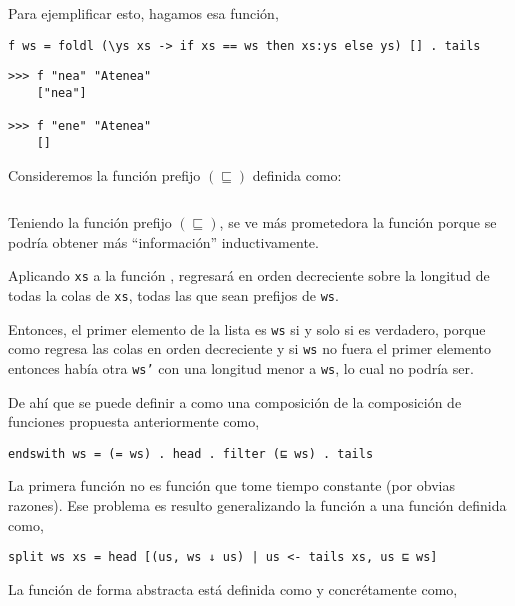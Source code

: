 Para ejemplificar esto, hagamos esa función,
\begin{verbatim}
f ws = foldl (\ys xs -> if xs == ws then xs:ys else ys) [] . tails
\end{verbatim}

\begin{verbatim}
>>> f "nea" "Atenea"
    ["nea"]

>>> f "ene" "Atenea"
    []
\end{verbatim}

Consideremos la función prefijo $(\sqsubseteq)$ definida como:

\inputminted{haskell}{definiciones/prefix.hs}

Teniendo la función prefijo $(\sqsubseteq)$, se ve más prometedora la función
 porque se podría obtener más ``información'' inductivamente.

Aplicando \texttt{xs} a la función , regresará en orden decreciente
sobre la longitud de todas la colas de \texttt{xs}, todas las que sean prefijos de \texttt{ws}.


Entonces, el primer elemento de la lista es \texttt{ws} si y solo si  es
verdadero, porque como  regresa las colas en orden decreciente y si \texttt{ws} no 
fuera el primer elemento entonces había otra \texttt{ws'} con una longitud menor a \texttt{ws}, lo
cual no podría ser.

De ahí que se puede definir a  como una composición de la composición de funciones
 propuesta anteriormente como,

\begin{verbatim}
endswith ws = (= ws) . head . filter (⊑ ws) . tails
\end{verbatim}

La primera función  no es función que tome tiempo constante (por obvias razones). 
Ese problema es resulto generalizando la función  a una función
 definida como,

\begin{verbatim}
split ws xs = head [(us, ws ↓ us) | us <- tails xs, us ⊑ ws]
\end{verbatim}

La función  de forma abstracta está definida como  y
concrétamente como,

